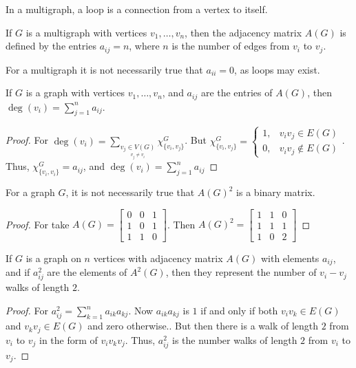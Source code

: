         \begin{definition}
        In a multigraph, a loop is a connection from a vertex to itself.
        \end{definition}
        \begin{definition}
        If $G$ is a multigraph with vertices $v_1,\hdots, v_n$, then the adjacency matrix $A(G)$ is defined by the entries $a_{ij} = n$, where $n$ is the number of edges from $v_i$ to $v_j$. 
        \end{definition}
        For a multigraph it is not necessarily true that $a_{ii}=0$, as
        loops may exist.
        \begin{theorem}
        If $G$ is a graph with vertices $v_1,\hdots, v_n$, and $a_{ij}$ are the entries of $A(G)$, then $\deg(v_i) = \sum_{j=1}^{n} a_{ij}$.
        \end{theorem}
        \begin{proof}
        For $\deg(v_i) = \sum_{\underset{v_j\ne v_i}{v_j\in V(G)}}\chi_{\{v_i,v_j\}}^G$. But $\chi_{\{v_i,v_j\}}^G = \begin{cases} 1, & v_iv_j\in E(G)\\ 0, & v_iv_j \notin E(G)\end{cases}$. Thus, $\chi_{\{v_i,v_i\}}^G = a_{ij}$, and $\deg(v_i) = \sum_{j=1}^{n} a_{ij}$
        \end{proof}
        \begin{theorem}
        For a graph $G$, it is not necessarily true that $A(G)^2$ is a binary matrix.
        \end{theorem}
        \begin{proof}
        For take $A(G) = \begin{bmatrix} 0 & 0 & 1 \\ 1 & 0 & 1 \\ 1& 1 & 0 \end{bmatrix}$. Then $A(G)^2 = \begin{bmatrix} 1 & 1 & 0 \\ 1 & 1 & 1 \\ 1 & 0 & 2 \end{bmatrix}$
        \end{proof}
        \begin{theorem}
        If $G$ is a graph on $n$ vertices with adjacency matrix $A(G)$ with elements $a_{ij}$, and if $a^2_{ij}$ are the elements of $A^2(G)$, then they represent the number of $v_{i}-v_{j}$ walks of length $2$.
        \end{theorem}
        \begin{proof}
        For $a^2_{ij} = \sum_{k=1}^{n} a_{ik}a_{kj}$. Now $a_{ik}a_{kj}$ is $1$ if and only if both $v_iv_k \in E(G)$ and $v_kv_j \in E(G)$ and zero otherwise.. But then there is a walk of length $2$ from $v_i$ to $v_j$ in the form of $v_i v_k v_j$. Thus, $a^2_{ij}$ is the number walks of length $2$ from $v_i$ to $v_j$.
        \end{proof} 

